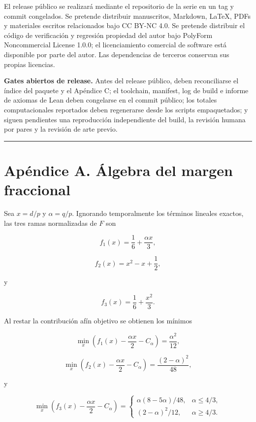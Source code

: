 \documentclass[
  11pt,
]{article}
\begin{document}
El release público se realizará mediante el repositorio de la serie en
un tag y commit congelados. Se pretende distribuir manuscritos,
Markdown, LaTeX, PDFs y materiales escritos relacionados bajo CC BY-NC
4.0. Se pretende distribuir el código de verificación y regresión
propiedad del autor bajo PolyForm Noncommercial License 1.0.0; el
licenciamiento comercial de software está disponible por parte del
autor. Las dependencias de terceros conservan sus propias licencias.

\textbf{Gates abiertos de release.} Antes del release público, deben
reconciliarse el índice del paquete y el Apéndice C; el toolchain,
manifest, log de build e informe de axiomas de Lean deben congelarse en
el commit público; los totales computacionales reportados deben
regenerarse desde los scripts empaquetados; y siguen pendientes una
reproducción independiente del build, la revisión humana por pares y la
revisión de arte previo.

\begin{center}\rule{0.5\linewidth}{0.5pt}\end{center}

\section{Apéndice A. Álgebra del margen
fraccional}\label{apuxe9ndice-a.-uxe1lgebra-del-margen-fraccional}

Sea \(x=d/p\) y \(\alpha=q/p\). Ignorando temporalmente los términos
lineales exactos, las tres ramas normalizadas de \(F\) son

\[
f_1(x)=\frac16+\frac{\alpha x}{3},
\]

\[
f_2(x)=x^2-x+\frac12,
\]

y

\[
f_3(x)=\frac16+\frac{x^2}{3}.
\]

Al restar la contribución afín objetivo se obtienen los mínimos

\[
\min_x\left(f_1(x)-\frac{\alpha x}{2}-C_\alpha\right)
=
\frac{\alpha^2}{12},
\]

\[
\min_x\left(f_2(x)-\frac{\alpha x}{2}-C_\alpha\right)
=
\frac{(2-\alpha)^2}{48},
\]

y

\[
\min_x\left(f_3(x)-\frac{\alpha x}{2}-C_\alpha\right)
=
\begin{cases}
\alpha(8-5\alpha)/48,&\alpha\le4/3,\\
(2-\alpha)^2/12,&\alpha\ge4/3.
\end{cases}
\]
\end{document}
